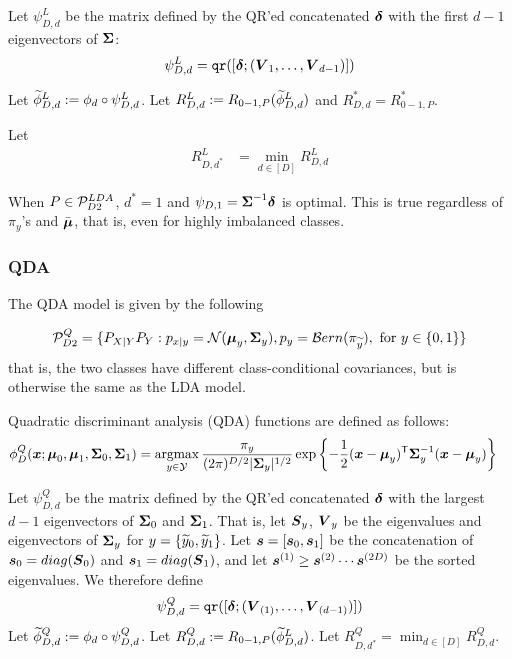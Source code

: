 \documentclass[10pt]{article}
\begin{document}
 Let $\psi_{D,d}^L$ be the matrix defined by the QR'ed concatenated $\boldsymbol{\delta}$ with the first $d-1$ eigenvectors of $\boldsymbol{\Sigma}$:
\begin{align}
	\psi_{D,d}^L = {\sc \texttt{qr}}([\boldsymbol{\delta}; (\boldsymbol{V}_1,\ldots, \boldsymbol{V}_{d-1})])
\end{align}

Let $\widetilde{\phi}_{D,d}^L:= \phi_d \circ \psi_{D,d}^L$. Let $R^L_{D,d}:=R_{0-1,P}(\widetilde{\phi}_{D,d}^L)$ and $R^*_{D,d}=R_{0-1,P}^*$.





Let
\begin{align}
	R^L_{D,d^*} &= \min_{d \in [D]} R^L_{D,d}
\end{align}


\begin{rem}
	When $P \in \mathcal{P}^{LDA}_{D2}$,  $d^*=1$ and  $\psi_{D,1}=\boldsymbol{\Sigma}^{-1} \boldsymbol{\delta}$ is optimal. This is true regardless of $\pi_y$'s and $\bar{\boldsymbol{\mu}}$, that is, even for highly imbalanced classes.
\end{rem}

\subsubsection{QDA}



The QDA model is given by the following
\begin{model}
	\begin{align}
		\mathcal{P}^Q_{D2}=\{P_{X|Y}P_Y : p_{x|y}=\mathcal{N}(\boldsymbol{\mu}_{y},\boldsymbol{\Sigma}_y), p_y = \mathcal{B}ern( \pi_{\widetilde{y}}), \text{ for } y \in \{0,1\} \}
	\end{align}
that is, the two classes have different class-conditional covariances, but is otherwise the same as the LDA model.
\end{model}


Quadratic discriminant analysis (QDA) functions are defined as follows: 
\begin{align}
	\phi_D^Q(\bx; \bmu_0, \bmu_1, \bSig_0, \bSig_1) &= \argmax_{y \in \mc{Y}} \frac{\pi_y}{(2\pi)^{D/2}|\bSig_y|^{1/2} }  \exp\left\{-\frac{1}{2} (\bx-\bmu_y)\T \bSig_y^{-1}(\bx-\bmu_y) \right\} 
\end{align}




 Let $\psi_{D,d}^Q$ be the matrix defined by the QR'ed concatenated $\boldsymbol{\delta}$ with the largest $d-1$ eigenvectors of $\boldsymbol{\Sigma}_0$ and $\boldsymbol{\Sigma}_1$.  That is, let $\boldsymbol{S}_y$, $\boldsymbol{V}_y$ be the eigenvalues and eigenvectors of $\boldsymbol{\Sigma}_y$ for $y = \{\widetilde{y}_0,\widetilde{y}_1\}$.  Let $\boldsymbol{s}=[\boldsymbol{s}_0,\boldsymbol{s}_1]$ be the concatenation of $\boldsymbol{s}_0=diag(\boldsymbol{S}_0)$ and $\boldsymbol{s}_1=diag(\boldsymbol{S}_1)$, and let $\boldsymbol{s}^{(1)} \geq \boldsymbol{s}^{(2)} \cdots \boldsymbol{s}^{(2D)}$ be the sorted eigenvalues.  We therefore define
\begin{align}
	\psi_{D,d}^Q = {\sc \texttt{qr}}([\boldsymbol{\delta}; (\boldsymbol{V}_{(1)},\ldots, \boldsymbol{V}_{(d-1)})])
\end{align}
Let $\widetilde{\phi}_{D,d}^Q:= \phi_d \circ \psi_{D,d}^Q$. Let $R^Q_{D,d}:=R_{0-1,P}(\widetilde{\phi}_{D,d}^L)$.  Let $R^Q_{D,d^*} = \min_{d \in [D]} R^Q_{D,d}$.
\end{document}
